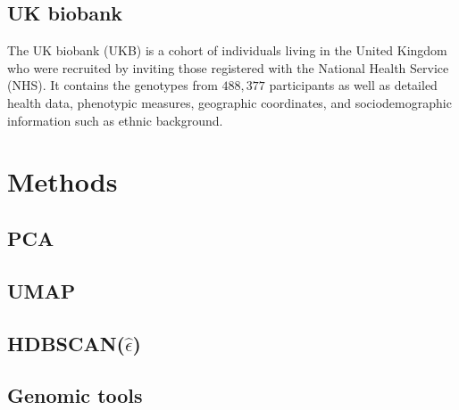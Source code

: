 \subsection{UK biobank}

The UK biobank (UKB) is a cohort of individuals living in the United Kingdom who were recruited by inviting those registered with the National Health Service (NHS)\citep{sudlow_uk_2015}. It contains the genotypes from $488,377$ participants as well as detailed health data, phenotypic measures, geographic coordinates, and sociodemographic information such as ethnic background.

\section{Methods}

\subsection{PCA}

\subsection{UMAP}

\subsection{HDBSCAN(\texorpdfstring{$\hat{\epsilon}$}{f})}

\subsection{Genomic tools}